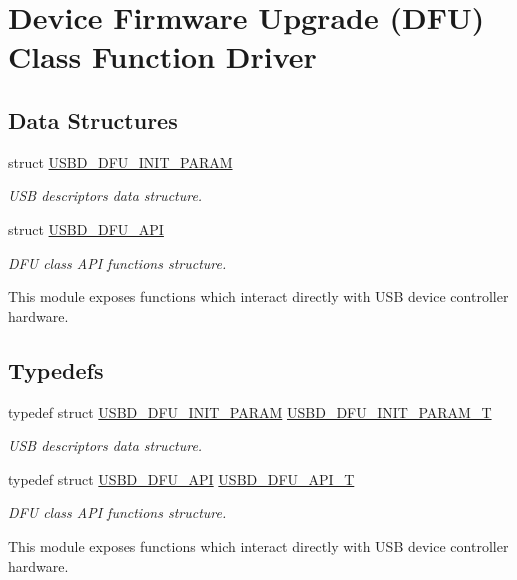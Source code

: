 \hypertarget{group__USBD__DFU}{\section{Device Firmware Upgrade (D\-F\-U) Class Function Driver}
\label{group__USBD__DFU}
}
\subsection*{Data Structures}
\begin{DoxyCompactItemize}
\item 
struct \hyperlink{structUSBD__DFU__INIT__PARAM}{U\-S\-B\-D\-\_\-\-D\-F\-U\-\_\-\-I\-N\-I\-T\-\_\-\-P\-A\-R\-A\-M}
\begin{DoxyCompactList}\small\item\em U\-S\-B descriptors data structure. \end{DoxyCompactList}\item 
struct \hyperlink{structUSBD__DFU__API}{U\-S\-B\-D\-\_\-\-D\-F\-U\-\_\-\-A\-P\-I}
\begin{DoxyCompactList}\small\item\em D\-F\-U class A\-P\-I functions structure.

This module exposes functions which interact directly with U\-S\-B device controller hardware. \end{DoxyCompactList}\end{DoxyCompactItemize}
\subsection*{Typedefs}
\begin{DoxyCompactItemize}
\item 
typedef struct \hyperlink{structUSBD__DFU__INIT__PARAM}{U\-S\-B\-D\-\_\-\-D\-F\-U\-\_\-\-I\-N\-I\-T\-\_\-\-P\-A\-R\-A\-M} \hyperlink{group__USBD__DFU_ga8506b43ae2bda83cc8c459114fd3fc82}{U\-S\-B\-D\-\_\-\-D\-F\-U\-\_\-\-I\-N\-I\-T\-\_\-\-P\-A\-R\-A\-M\-\_\-\-T}
\begin{DoxyCompactList}\small\item\em U\-S\-B descriptors data structure. \end{DoxyCompactList}\item 
typedef struct \hyperlink{structUSBD__DFU__API}{U\-S\-B\-D\-\_\-\-D\-F\-U\-\_\-\-A\-P\-I} \hyperlink{group__USBD__DFU_gadf9281f8af1223053e3ccf48e26ac80d}{U\-S\-B\-D\-\_\-\-D\-F\-U\-\_\-\-A\-P\-I\-\_\-\-T}
\begin{DoxyCompactList}\small\item\em D\-F\-U class A\-P\-I functions structure.

This module exposes functions which interact directly with U\-S\-B device controller hardware. \end{DoxyCompactList}\end{DoxyCompactItemize}


